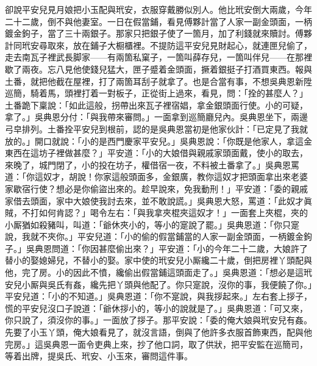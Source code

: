 卻說平安兒見月娘把小玉配與玳安，衣服穿戴勝似別人。他比玳安倒大兩歲，今年二十二歲，倒不與他妻室。一日在假當鋪，看見傅夥計當了人家一副金頭面，一柄鍍金鉤子，當了三十兩銀子。那家只把銀子使了一箇月，加了利錢就來贖討。傅夥計同玳安尋取來，放在鋪子大橱櫃裡。不提防這平安兒見財起心，就連匣兒偷了，走去南瓦子裡武長脚家——有兩箇私窠子，一箇叫薛存兒，一箇叫伴兒——在那裡歇了兩夜。忘八見他使錢兒猛大，匣子蹙着金頭面，撅着銀挺子打酒買東西。報與土番，就把他截在屋裡，打了兩箇耳刮子就拿了。也是合當有事，不想吳典恩新陞巡簡，騎着馬，頭裡打着一對板子，正從街上過來，看見，問：「拴的甚麼人？」土番跪下稟說：「如此這般，拐帶出來瓦子裡宿娼，拿金銀頭面行使。小的可疑，拿了。」吳典恩分付：「與我帶來審問。」一面拿到巡簡廳兒內。吳典恩坐下，兩邊弓皁排列。土番拴平安兒到根前，認的是吳典恩當初是他家伙計：「已定見了我就放的。」開口就說：「小的是西門慶家平安兒。」吳典恩說：「你既是他家人，拿這金東西在這坊子裡做甚麼？」平安道：「小的大娘借與親戚家頭面戴，使小的取去，來晚了，城門閉了，小的投在坊子，權借宿一夜，不料被土番拿了。」吳典恩罵道：「你這奴才，胡說！你家這般頭面多，金銀廣，教你這奴才把頭面拿出來老婆家歇宿行使？{}想必是你偷盜出來的。趁早說來，免我動刑！」平安道：「委的親戚家借去頭面，家中大娘使我討去來，並不敢說謊。」吳典恩大怒，罵道：「此奴才眞賊，不打如何肯認？」喝令左右：「與我拿夾棍夾這奴才！」一面套上夾棍，夾的小厮猶如殺豬叫，叫道：「爺休夾小的，等小的寔說了罷。」吳典恩道：「你只寔說，我就不夾你。」平安兒道：「小的偷的假當鋪當的人家一副金頭面，一柄鍍金鉤子。」吳典恩問道：「你因甚麼偷出來？」平安道：「小的今年二十二歲，大娘許了替小的娶媳婦兒，不替小的娶。家中使的玳安兒小厮纔二十歲，倒把房裡丫頭配與他，完了房。小的因此不憤，纔偷出假當鋪這頭面走了。」吳典恩道：「想必是這玳安兒小厮與吳氏有姦，纔先把丫頭與他配了。你只寔說，沒你的事，我便饒了你。」{}平安兒道：「小的不知道。」吳典恩道：「你不寔說，與我拶起來。」左右套上拶子，慌的平安兒沒口子說道：「爺休拶小的，等小的說就是了。」吳典恩道：「可又來，你只說了，須沒你的事。」一面放了拶子。那平安說：「委的俺大娘與玳安兒有姦。先要了小玉丫頭，俺大娘看見了，就沒言語，倒與了他許多衣服首飾東西，配與他完房。」這吳典恩一面令吏典上來，抄了他口詞，取了供狀，把平安監在巡簡司，等着出牌，提吳氏、玳安、小玉來，審問這件事。

